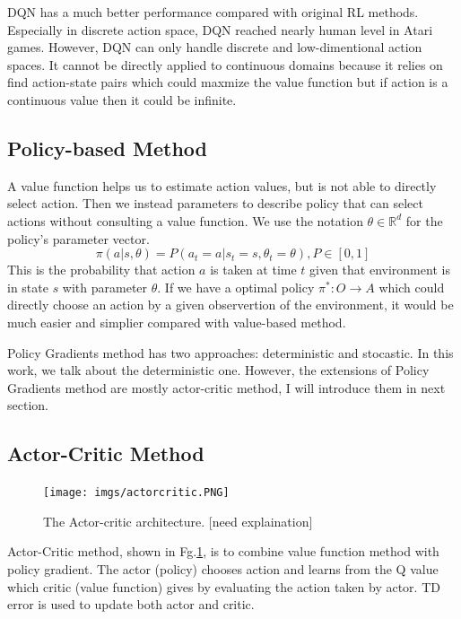 \documentclass[11pt,twocolumn]{jarticle} %
\begin{document}
DQN has a much better performance compared with original RL methods. Especially in discrete action space, DQN reached nearly human level in Atari games. However, DQN can only handle discrete and low-dimentional action spaces. It cannot be directly applied to continuous domains because it relies on find action-state pairs which could maxmize the value function but if action is a continuous value then it could be infinite. \par

\subsection{Policy-based Method}
A value function helps us to estimate action values, but is not able to directly select action. Then we instead parameters to describe policy that can select actions without consulting a value function. We use the notation $\theta \in \mathbb{R}^d$ for the policy's parameter vector.
\begin{equation}
\pi(a|s, \theta) = P(a_t = a | s_t = s, \theta_t = \theta), P \in [0, 1] 
\end{equation}
This is the probability that action $a$ is taken at time $t$ given that environment is in state $s$ with parameter $\theta$.
If we have a optimal policy $\pi^*: O \rightarrow A$ which could directly choose an action by a given observertion of the environment, it would be much easier and simplier compared with value-based method. \par
Policy Gradients method has two approaches: deterministic and stocastic. In this work, we talk about the deterministic one.
However, the extensions of Policy Gradients method are mostly actor-critic method, I will introduce them in next section. 


\subsection{Actor-Critic Method}
\begin{figure}[h]
 \begin{center}
  \texttt{[image: imgs/actorcritic.PNG]}
  \caption{
  The Actor-critic architecture. [need explaination]
  }
  \label{fig:actorcritic}
 \end{center}
\end{figure}
Actor-Critic method, shown in Fg.\ref{fig:actorcritic}, is to combine value function method with policy gradient. The actor (policy) chooses action and learns from the Q value which critic (value function) gives by evaluating the action taken by actor. TD error is used to update both actor and critic.
\end{document}
